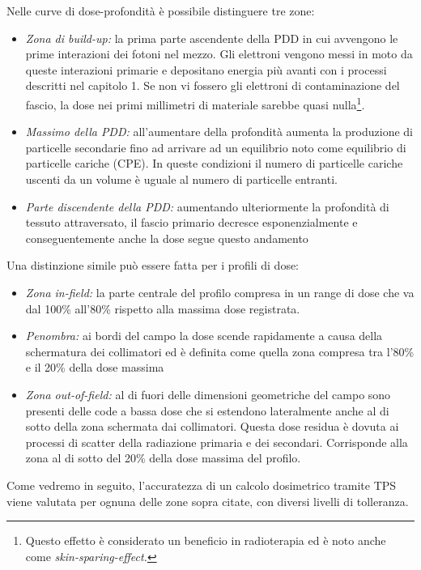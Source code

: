 Nelle curve di dose-profondità è possibile distinguere tre zone:
\begin{itemize}
\item \textit{Zona di build-up:} la prima parte ascendente della PDD in cui avvengono le prime interazioni dei fotoni nel mezzo. Gli elettroni vengono messi in moto da queste interazioni primarie e depositano energia più avanti con i processi descritti nel capitolo 1. Se non vi fossero gli elettroni di contaminazione del fascio, la dose nei primi millimetri di materiale sarebbe quasi nulla\footnote{Questo effetto è considerato un beneficio in radioterapia ed è noto anche come \textit{skin-sparing-effect.}}.
\item \textit{Massimo della PDD:} all'aumentare della profondità aumenta la produzione di particelle secondarie fino ad arrivare ad un equilibrio noto come equilibrio di particelle cariche (CPE). In queste condizioni il numero di particelle cariche uscenti da un volume è uguale al numero di particelle entranti.
\item \textit{Parte discendente della PDD:} aumentando ulteriormente la profondità di tessuto attraversato, il fascio primario decresce esponenzialmente e conseguentemente anche la dose segue questo andamento
\end{itemize}

Una distinzione simile può essere fatta per i profili di dose:
\begin{itemize}
\item \textit{Zona in-field:} la parte centrale del profilo compresa in un range di dose che va dal 100\% all'80\% rispetto alla massima dose registrata.
\item \textit{Penombra:} ai bordi del campo la dose scende rapidamente a causa della schermatura dei collimatori ed è definita come quella zona compresa tra l'80\% e il 20\% della dose massima
\item \textit{Zona out-of-field:} al di fuori delle dimensioni geometriche del campo sono presenti delle code a bassa dose che si estendono lateralmente anche al di sotto della zona schermata dai collimatori. Questa dose residua è dovuta ai processi di scatter della radiazione primaria e dei secondari. Corrisponde alla zona al di sotto del 20\% della dose massima del profilo.
\end{itemize}

Come vedremo in seguito, l'accuratezza di un calcolo dosimetrico tramite TPS viene valutata per ognuna delle zone sopra citate, con diversi livelli di tolleranza. 

